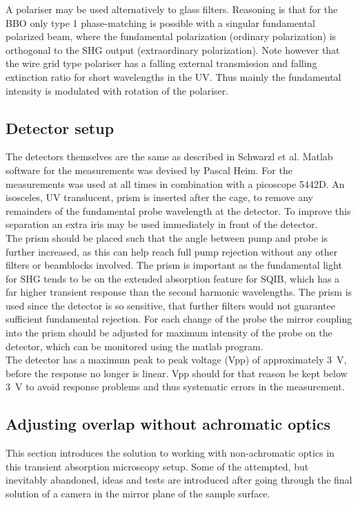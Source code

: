 \documentclass[twoside,openright,listof=numbered]{scrreprt}
\begin{document}
A polariser may be used alternatively to glass filters. Reasoning is that for the BBO only type 1 phase-matching is possible with a singular fundamental polarized beam, where the fundamental polarization (ordinary polarization) is orthogonal to the SHG output (extraordinary polarization). Note however that the wire grid type polariser has a falling external transmission and falling extinction ratio for short wavelengths in the UV. Thus mainly the fundamental intensity is modulated with rotation of the polariser.

\subsection{Detector setup}
The detectors themselves are the same as described in Schwarzl et al\cite{Schwarzl2022}. Matlab software for the measurements was devised by Pascal Heim. For the measurements  was used at all times in combination with a picoscope 5442D. An isosceles, UV translucent, prism is inserted after the cage, to remove any remainders of the fundamental probe wavelength at the detector. To improve this separation an extra iris may be used immediately in front of the detector.\\
The prism should be placed such that the angle between pump and probe is further increased, as this can help reach full pump rejection without any other filters or beamblocks involved. The prism is important as the fundamental light for SHG tends to be on the extended absorption feature for SQIB, which has a far higher transient response than the second harmonic wavelengths. The prism is used since the detector is so sensitive, that further filters would not guarantee sufficient fundamental rejection. For each change of the probe the mirror coupling into the prism should be adjusted for maximum intensity of the probe on the detector, which can be monitored using the  matlab program.\\
The detector has a maximum peak to peak voltage (Vpp) of approximately \qty	{3}{\volt}, before the response no longer is linear. Vpp should for that reason be kept below \qty{3}{\volt} to avoid response problems and thus systematic errors in the measurement.
\subsection{Adjusting overlap without achromatic optics}\label{sec:overlapChromaticAberration}
This section introduces the solution to working with non-achromatic optics in this transient absorption microscopy setup. Some of the attempted, but inevitably abandoned, ideas and tests are introduced after going through the final solution of a camera in the mirror plane of the sample surface.
\end{document}

